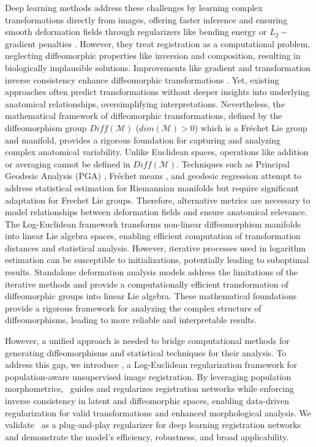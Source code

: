 Deep learning methods address these challenges by learning complex transformations directly from images, offering faster inference and ensuring smooth deformation fields through regularizers like bending energy or \(L_2-\)gradient penalties \cite{balakrishnan2019voxelmorph,chen2022transmorph}. However, they treat registration as a computational problem, neglecting diffeomorphic properties like inversion and composition, resulting in biologically implausible solutions. Improvements like gradient and transformation inverse consistency enhance diffeomorphic transformations \cite{tian2023gradicon}. Yet, existing approaches often predict transformations without deeper insights into underlying anatomical relationships, oversimplifying interpretations.
%
Nevertheless, the mathematical framework of diffeomorphic transformations, defined by the diffeomorphism group \(Diff(\mathcal{M})\) (\(dim(\mathcal{M})>0\)) which is a Fréchet Lie group and manifold, provides a rigorous foundation for capturing and analyzing complex anatomical variability.
%
Unlike Euclidean spaces, operations like addition or averaging cannot be defined in \(Diff(\mathcal{M})\). Techniques such as Principal Geodesic Analysis (PGA) \cite{fletcher2004principal}, Fréchet means \cite{le2000frechet}, and geodesic regression \cite{fletcher2011geodesic} attempt to address statistical estimation for Riemannian manifolds but require significant adaptation for Frechet Lie groups. Therefore, alternative metrics are necessary to model relationships between deformation fields and ensure anatomical relevance. The Log-Euclidean framework \cite{arsigny2006log} transforms non-linear diffeomorphism manifolds into linear Lie algebra spaces, enabling efficient computation of transformation distances and statistical analysis. However, iterative processes used in logarithm estimation can be susceptible to initializations, potentially leading to suboptimal results. Standalone deformation analysis models address the limitations of the iterative methods and provide a computationally efficient transformation of diffeomorphic groups into linear Lie algebra. These mathematical foundations provide a rigorous framework for analyzing the complex structure of diffeomorphisms, leading to more reliable and interpretable results. 

However, a unified approach is needed to bridge computational methods for generating diffeomorphisms and statistical techniques for their analysis. To address this gap, we introduce \model, a Log-Euclidean regularization framework for population-aware unsupervised image registration. By leveraging population morphometrics, \model~guides and regularizes registration networks while enforcing inverse consistency in latent and diffeomorphic spaces, enabling data-driven regularization for valid transformations and enhanced morphological analysis. We validate \model~as a plug-and-play regularizer for deep learning registration networks and demonstrate the model's efficiency, robustness, and broad applicability.
